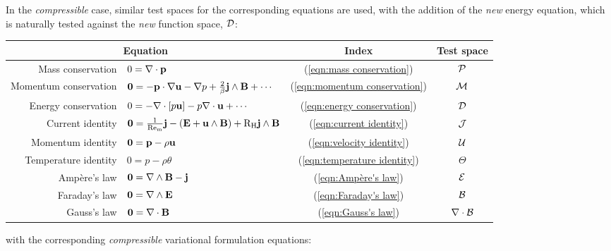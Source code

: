     In the \emph{compressible} case, similar test spaces for the corresponding equations are used, with the addition of the \emph{new} energy equation, which is naturally tested against the \emph{new} function space, $\mathcal{D}$:
    \begin{center}\begin{tabular}{ r l c | c }
        \multicolumn{2}{c}{Equation}  &  Index  &  Test space  \\
        \hline\hline
        Mass conservation  &  $0  =  \nabla\cdot\mathbf{p}$  &  (\ref{eqn:mass conservation})  &  $\mathcal{P}$  \\
        Momentum conservation  &  $\mathbf{0} 
         =  - \mathbf{p}\cdot\nabla\mathbf{u} - \nabla p + \frac{2}{\beta}\mathbf{j}\wedge\mathbf{B} + \cdots$  &  (\ref{eqn:momentum conservation})  &  $\mathcal{M}$  \\
        Energy conservation  &  $0  =  - \nabla\cdot[p\mathbf{u}] - p\nabla\cdot\mathbf{u} + \cdots$  &  (\ref{eqn:energy conservation})  &  $\mathcal{D}$  \\
        \hline
        Current identity  &  $\mathbf{0}  =  \frac{1}{\mathrm{Re}_{\mathrm{m}}}\mathbf{j} - \left(\mathbf{E} + \mathbf{u}\wedge\mathbf{B}\right) + \mathrm{R}_{\mathrm{H}}\mathbf{j}\wedge\mathbf{B}$  &  (\ref{eqn:current identity})  &  $\mathcal{J}$  \\
        \hline
        Momentum identity  &  $\mathbf{0}  =  \mathbf{p} - \rho\mathbf{u}$  &  (\ref{eqn:velocity identity})  &  $\mathcal{U}$  \\
        Temperature identity  &  $0  =  p - \rho\theta$  &  (\ref{eqn:temperature identity})  &  $\Theta$  \\
        \hline
        Ampère's law  &  $\mathbf{0}  =  \nabla\wedge\mathbf{B} - \mathbf{j}$  &  (\ref{eqn:Ampère's law})  &  $\mathcal{E}$  \\
        Faraday's law  &  $\mathbf{0}  =  \nabla\wedge\mathbf{E}$  &  (\ref{eqn:Faraday's law})  &  $\mathcal{B}$  \\
        Gauss's law  &  $\mathbf{0}  =  \nabla\cdot\mathbf{B}$  &  (\ref{eqn:Gauss's law})  &  $\nabla\cdot\mathcal{B}$  \\
    \end{tabular}\end{center}
    with the corresponding \emph{compressible} variational formulation equations:
    
    \line
    
